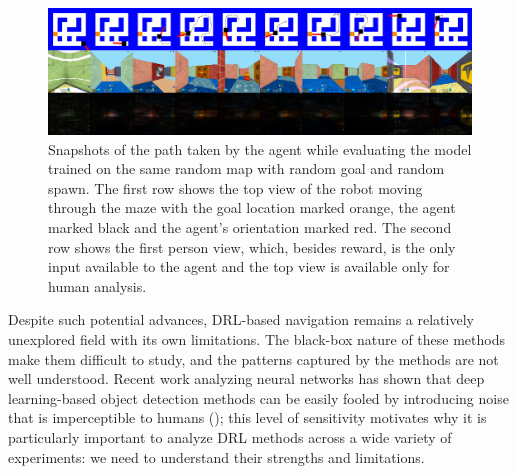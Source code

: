 \begin{figure}
\includegraphics[width=\textwidth,trim=0 336pt 0 0,clip]{./exp-results/training-09x09-0127-on-0127.png}%
\caption{
Snapshots of the path taken by the agent while evaluating the model trained on the same random map with random goal and random spawn.
The first row shows the top view of the robot moving through the maze with the goal location marked orange, the agent marked black and the agent's orientation marked red. The second row shows the first person view, which, besides reward, is the only input available to the agent and the top view is available only for human analysis.}
\label{fig:training-qualitative}
\end{figure}

Despite such potential advances, DRL-based navigation remains a relatively unexplored field with its own limitations. 
The black-box nature of these methods make them difficult to study, and the patterns captured by the methods are not well understood. 
Recent work analyzing neural networks has shown that deep learning-based object detection methods can be easily fooled by introducing noise that is imperceptible to humans (\cite{NgYoClCVPR2015}); this level of sensitivity motivates why it is particularly important to analyze DRL methods across a wide variety of experiments: we need to understand their strengths and limitations.


